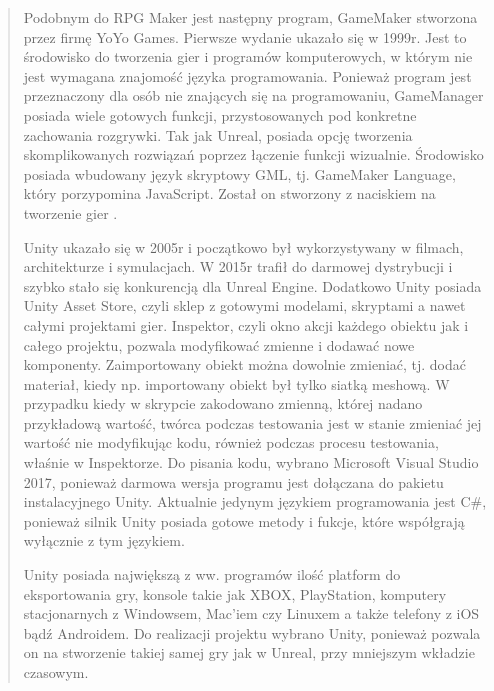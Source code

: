 \begin{quotation}
\indent Podobnym do RPG Maker jest następny program, GameMaker stworzona przez firmę YoYo Games. Pierwsze wydanie ukazało się w 1999r. Jest to środowisko do tworzenia gier i programów komputerowych, w którym nie jest wymagana znajomość języka programowania. Ponieważ program jest przeznaczony dla osób nie znających się na programowaniu, GameManager posiada wiele gotowych funkcji, przystosowanych pod konkretne zachowania rozgrywki.  Tak jak Unreal, posiada opcję tworzenia skomplikowanych rozwiązań poprzez łączenie funkcji wizualnie. Środowisko posiada wbudowany język skryptowy GML, tj. GameMaker Language, który porzypomina JavaScript. Został on stworzony z naciskiem na tworzenie gier \cite{2}.

\indent Unity ukazało się w 2005r i początkowo był wykorzystywany w filmach, architekturze i symulacjach. W 2015r trafił do darmowej dystrybucji i szybko stało się konkurencją dla Unreal Engine. Dodatkowo Unity posiada Unity Asset Store, czyli sklep z gotowymi modelami, skryptami a nawet całymi projektami gier. Inspektor, czyli okno akcji każdego obiektu jak i całego projektu, pozwala modyfikować zmienne i dodawać nowe komponenty. Zaimportowany obiekt można dowolnie zmieniać, tj. dodać materiał, kiedy np. importowany obiekt był tylko siatką meshową. W przypadku kiedy w skrypcie zakodowano zmienną, której nadano przykładową wartość, twórca podczas testowania jest w stanie zmieniać jej wartość nie modyfikując kodu, również podczas procesu testowania, właśnie w Inspektorze. Do pisania kodu, wybrano Microsoft Visual Studio 2017, ponieważ darmowa wersja programu jest dołączana do pakietu instalacyjnego Unity. Aktualnie jedynym językiem programowania jest C\#, ponieważ silnik Unity posiada gotowe metody i fukcje, które współgrają wyłącznie z tym językiem. 

\newpage
Unity posiada największą z ww. programów ilość platform do eksportowania gry, konsole takie jak XBOX, PlayStation, komputery stacjonarnych z Windowsem, Mac'iem czy Linuxem a także telefony z iOS bądź Androidem. Do realizacji projektu wybrano Unity, ponieważ pozwala on na stworzenie takiej samej gry jak w Unreal, przy mniejszym wkładzie czasowym. 

\end{quotation}
